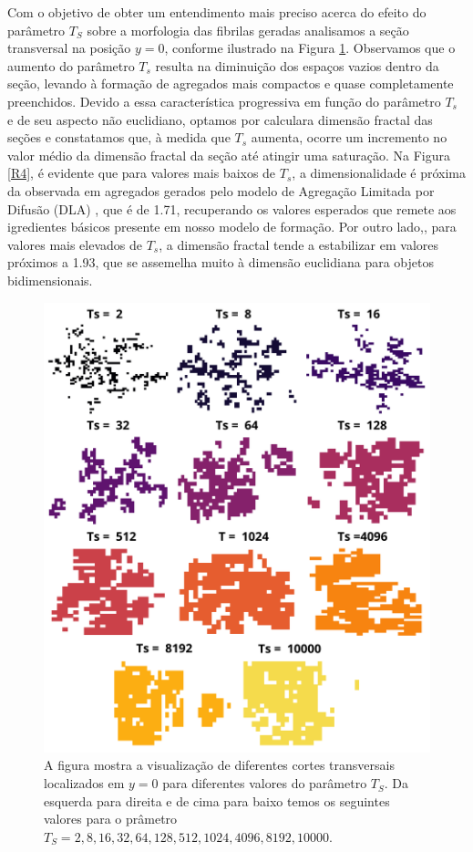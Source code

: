 \documentclass{article}
\begin{document}
    Com o objetivo de obter um entendimento mais preciso acerca do efeito do parâmetro $T_{S}$ sobre a morfologia das 
    fibrilas geradas analisamos a seção transversal na posição \(y=0\), conforme ilustrado na Figura \ref{R3}. Observamos 
    que o aumento do parâmetro \(T_{s}\) resulta na diminuição dos espaços vazios dentro da seção, levando à formação de 
    agregados mais compactos e quase completamente preenchidos. Devido a essa característica progressiva em função do 
    parâmetro \(T_{s}\) e de seu aspecto não euclidiano, optamos por calculara dimensão fractal das seções e constatamos que, à medida que \(T_{s}\) aumenta, ocorre um 
    incremento no valor médio da dimensão fractal da seção até atingir uma saturação. Na Figura \ref{R4}, é evidente 
    que para valores mais baixos de \(T_{s}\), a dimensionalidade é próxima da observada em agregados gerados pelo 
    modelo de Agregação Limitada por Difusão (DLA) \cite{Witten1983}, que é de 1.71, recuperando os valores esperados 
    que remete aos igredientes básicos presente em nosso modelo de formação. Por outro lado,, para valores mais elevados 
    de \(T_{s}\), a dimensão fractal tende a estabilizar em valores próximos a 1.93, que se assemelha muito à dimensão 
    euclidiana para objetos bidimensionais. 

    \begin{figure}[H]
        \centering
        \includegraphics[width=\textwidth]{figures/cs_all.png}
        \caption{A figura mostra a visualização de diferentes cortes transversais localizados em \(y=0\) para diferentes 
        valores do parâmetro $T_{S}$. Da esquerda para direita e de cima para baixo temos os seguintes valores para o 
        prâmetro \(T_{S}=2,8,16,32,64,128,512,1024,4096,8192, 10000\).} 
        \label{R3}
    \end{figure}
\end{document}
